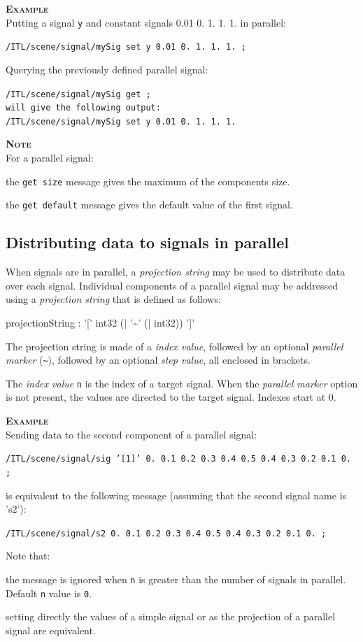 \documentclass[a4paper,twoside]{report}
\newcommand{\subsublevel}[1]	{\subsection{#1}}
\newcommand{\OSC}[1]		{\texttt{#1}}
\newcommand{\values}[1]		{\texttt{#1}}
\newcommand{\example}		{\textbf{\hspace{-1.5cm}\textbf{\textsc{Example }}}}
\newcommand{\note}	[1]		{\vspace{2mm}\textbf{\hspace{-0.9cm}\textbf{\textsc{Note #1}}}}
\let\olditemize\itemize
\let\oldenditemize\enditemize
\renewenvironment{itemize} 	{\olditemize \setlength{\itemsep}{1mm}}{\oldenditemize}
\newcommand{\sample}	[1]			{\vspace{-2mm}\begin{center}\colorbox{mygrey}{
								\begin{minipage}[t]{0.9\columnwidth} 
								{\small \texttt{#1}}
								\end{minipage}}\end{center}}
\newcommand{\sampleindent}	{ \hspace{0.5cm} }
\begin{document}
\example \\
Putting a signal \OSC{y} and constant signals 0.01 0. 1. 1. 1. in parallel:
\sample{/ITL/scene/signal/mySig set y 0.01 0. 1. 1. 1. ;}
Querying the previously defined parallel signal:
\sample{/ITL/scene/signal/mySig get ;\\
will give the following output: \\
/ITL/scene/signal/mySig set y 0.01 0. 1. 1. 1.
}

\note{} \\
For a parallel signal:
\begin{itemize}
\item the \OSC{get size} message gives the maximum of the components size. 
\item the \OSC{get default} message gives the default value of the first signal. 
\end{itemize}

\subsublevel{Distributing data to signals in parallel}
\label{sigproj}

When signals are in parallel, a \emph{projection string} may be used to distribute data over each signal.
Individual components of a parallel signal may be addressed using a \emph{projection string} that is defined as follows:
\begin{rail}
projectionString :  '[' int32 (| '\~{}' (| int32)) ']'
\end{rail}

The projection string is made of a \emph{index value}, followed by an optional \emph{parallel marker} (\OSC{\~{}}), followed by an optional \emph{step value}, all enclosed in brackets.

The \emph{index value} \values{n} is the index of a target signal. When the \emph{parallel marker} option is not present, the values are directed to the target signal. Indexes start at 0.

\example \\
Sending data to the second component of a parallel signal:
\sample{/ITL/scene/signal/sig '[1]' 0.\ 0.1\ 0.2\ 0.3\ 0.4\ 0.5\ 0.4\ 0.3\ 0.2\ 0.1\ 0. ;}
\sampleindent is equivalent to the following message (assuming that the second signal name is 's2'):
\sample{/ITL/scene/signal/s2 0.\ 0.1\ 0.2\ 0.3\ 0.4\ 0.5\ 0.4\ 0.3\ 0.2\ 0.1\ 0. ;}

Note that:
\begin{itemize}
\item the message is ignored when \values{n} is greater than the number of signals in parallel. Default \values{n} value is \values{0}. 
\item setting directly the values of a simple signal or as the projection of a parallel signal are equivalent.
\end{itemize}
\end{document}
